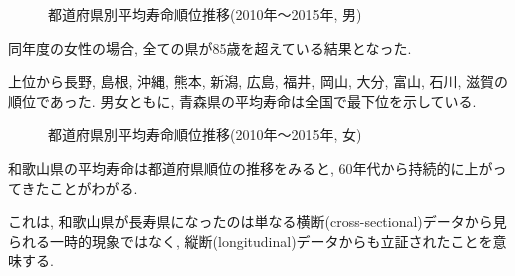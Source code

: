 \begin{figure}[h!]
	\begin{center}
		\caption{都道府県別平均寿命順位推移(2010年〜2015年, 男)}
	\end{center}
\end{figure}


同年度の女性の場合, 全ての県が85歳を超えている結果となった.

上位から長野, 島根, 沖縄, 熊本, 新潟, 広島, 福井, 岡山, 大分, 富山, 石川, 滋賀の順位であった.
男女ともに, 青森県の平均寿命は全国で最下位を示している.
\begin{figure}[h!]
	\begin{center}
		\caption{都道府県別平均寿命順位推移(2010年〜2015年, 女)}\end{center}
\end{figure}






和歌山県の平均寿命は都道府県順位の推移をみると,
60年代から持続的に上がってきたことがわがる.

これは, 和歌山県が長寿県になったのは単なる横断(cross-sectional)データから見られる一時的現象ではなく, 縦断(longitudinal)データからも立証されたことを意味する.


